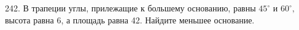 242. В трапеции углы, прилежащие к большему основанию, равны $45^\circ$ и $60^\circ,$ высота равна 6, а площадь равна 42. Найдите меньшее основание.\\
